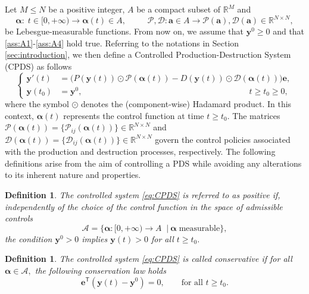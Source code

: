 \documentclass[10pt]{article}
\newtheorem{defn}[theorem]{Definition}
\theoremstyle{remark}
\newcommand{\tpose}{^\mathsf{T}}
\theoremstyle{definition}
\theoremstyle{remark}
\begin{document}
Let $M\leq N$ be a positive integer, $A$ be a compact subset of $\mathbb{R}^M$ and
\begin{equation}\label{eq:control_function}
    \bm{\alpha}: \; t\in [0,+\infty) \longrightarrow \bm{\alpha}(t)\in A, \; \qquad \; \mathcal{P},\mathcal{D}: \bm{a}\in A \longrightarrow \mathcal{P}(\bm{a}),\mathcal{D}(\bm{a})\in \mathbb{R}^{N\times N},
\end{equation}
be Lebesgue-measurable functions. From now on, we assume that $\bm{y}^0 \geq 0$ and that \ref{ass:A1}-\ref{ass:A4} hold true. Referring to the notations in Section \ref{sec:introduction}, we then define a Controlled Production-Destruction System (CPDS) as follows
\begin{equation}\label{eq:CPDS}
\left\{
\begin{aligned}
    \bm{y}'(t)&=\big(P(\bm{y}(t))\odot \mathcal{P}(\bm{\alpha}(t))-D(\bm{y}(t))\odot \mathcal{D}(\bm{\alpha}(t)) \big) \bm{e}, \\
    \bm{y}(t_0)&=\bm{y}^0, \qquad \qquad \qquad  \qquad \qquad \qquad  \qquad \qquad \qquad \qquad  t\geq t_0\geq 0,
\end{aligned}
\right.
\end{equation}
where the symbol $\odot$ denotes the (component-wise) Hadamard product. In this context, $\bm{\alpha}(t)$ represents the control function at time $t\geq t_0.$ The matrices $\mathcal{P}(\bm{\alpha}(t))=\{\mathcal{P}_{ij}(\bm{\alpha}(t))\}\in\mathbb{R}^{N\times N}$ and $\mathcal{D}(\bm{\alpha}(t))=\{\mathcal{D}_{ij}(\bm{\alpha}(t))\}\in\mathbb{R}^{N\times N}$ govern the control policies  associated with the production and destruction processes, respectively. The following definitions arise from the aim of controlling a PDS while avoiding any alterations to its inherent nature and properties.

\begin{defn}\label{defn:Positive_CPDS}
    The controlled system \eqref{eq:CPDS} is referred to as positive if, independently of the choice of the control function in the space of admissible controls
    \begin{equation}\label{eq:set_admissible_controls}
        \mathcal{A}=\{\bm{\alpha}: [0,+\infty) \longrightarrow A \;\; | \ \bm{\alpha} \; \mbox{measurable} \},
    \end{equation}
    the condition $\bm{y}^0>0$ implies $\bm{y}(t)>0$ for all $t\geq t_0.$
\end{defn}


\begin{defn}\label{defn:Conservativity_CPDS}
    The controlled system \eqref{eq:CPDS} is called conservative if for all $\bm{\alpha}\in\mathcal{A},$ the following conservation law holds
    \begin{equation*}
        \bm{e}\tpose(\bm{y}(t)-\bm{y}^0)=0, \qquad \mbox{for all } t\geq t_0.
    \end{equation*}
\end{defn}
\end{document}
